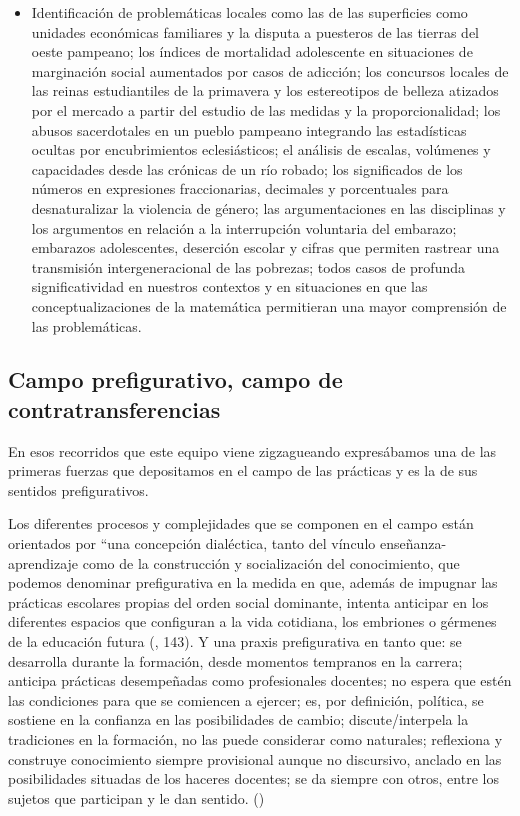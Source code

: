 \documentclass[oneside,spanish]{amsart}
\numberwithin{equation}{section}
\numberwithin{figure}{section}
\theoremstyle{definition}
\begin{document}
\begin{itemize}
	\item Identificación de problemáticas locales como las de las superficies como unidades económicas familiares y la disputa a puesteros de las tierras del oeste pampeano; los índices de mortalidad adolescente en situaciones de marginación social aumentados por casos de adicción; los concursos locales de las reinas estudiantiles de la primavera y los estereotipos de belleza atizados por el mercado a partir del estudio de las medidas y la proporcionalidad; los abusos sacerdotales en un pueblo pampeano integrando las estadísticas ocultas por encubrimientos eclesiásticos; el análisis de escalas, volúmenes y capacidades desde las crónicas de un río robado; los significados de los números en expresiones fraccionarias, decimales y porcentuales para desnaturalizar la violencia de género; las argumentaciones en las disciplinas y los argumentos en relación a la interrupción voluntaria del embarazo; embarazos adolescentes, deserción escolar y cifras que permiten rastrear una transmisión intergeneracional de las pobrezas; todos casos de profunda significatividad en nuestros contextos y en situaciones en que las conceptualizaciones de la matemática permitieran una mayor comprensión de las problemáticas.
\end{itemize}

\subsection{Campo prefigurativo, campo de contratransferencias}

En esos recorridos que este equipo viene zigzagueando expresábamos una de las primeras fuerzas que depositamos en el campo de las prácticas y es la de sus sentidos prefigurativos.

Los diferentes procesos y complejidades que se componen en el campo están orientados por “una concepción dialéctica, tanto del vínculo enseñanza-aprendizaje como de la construcción y socialización del conocimiento, que podemos denominar prefigurativa en la medida en que, además de impugnar las prácticas escolares propias del orden social dominante, intenta anticipar en los diferentes espacios que configuran a la vida cotidiana, los embriones o gérmenes de la educación futura (\cite{ouvina11}, 143). Y una praxis prefigurativa en tanto que: se desarrolla durante la formación, desde momentos tempranos en la carrera; anticipa prácticas desempeñadas como profesionales docentes; no espera que estén las condiciones para que se comiencen a ejercer;  es, por definición, política, se sostiene en la confianza en las posibilidades de cambio; discute/interpela la tradiciones en la formación, no las puede considerar como naturales; reflexiona y construye conocimiento siempre provisional aunque no discursivo, anclado en las posibilidades situadas de los haceres docentes; se da siempre con otros, entre los sujetos que participan y le dan sentido. (\cite{difranco11})
\end{document}
